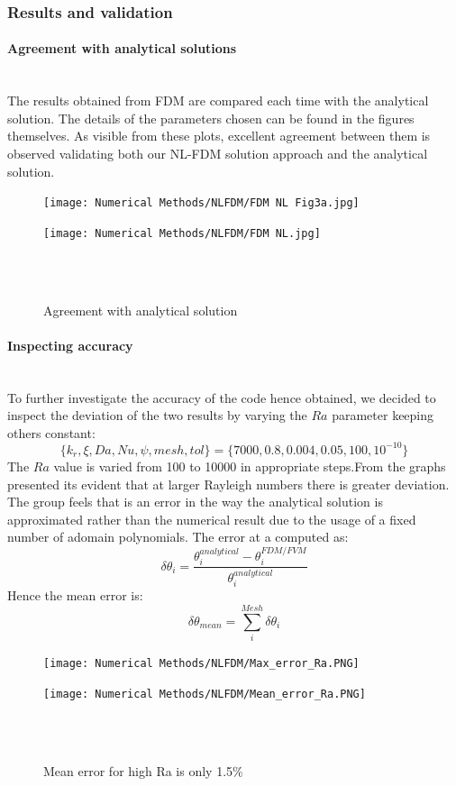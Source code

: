 \documentclass[12pt]{article}
\newcommand{\subsubsubsection}[1]{\paragraph{#1}\mbox{}\\}
\begin{document}
\subsubsection{Results and validation}
\subsubsubsection{Agreement with analytical solutions}
The results obtained from FDM are compared each time with the analytical solution. The details of the parameters chosen can be found in the figures themselves. As visible from these plots, excellent agreement between them is observed validating both our NL-FDM solution approach and the analytical solution.
\begin{figure}[H]
\begin{minipage}{.5\textwidth}
    \hspace{-1.4cm}
    \vspace{-1.4cm}
  \texttt{[image: Numerical Methods/NLFDM/FDM NL Fig3a.jpg]}
  \label{fig:12}
\end{minipage}%
\begin{minipage}{.5\textwidth}
  \hspace{-0.5cm}
  \vspace{-1.4cm}
  \texttt{[image: Numerical Methods/NLFDM/FDM NL.jpg]}
  \label{fig:13}
\end{minipage}
\\ \\ 
\caption{Agreement with analytical solution}
\end{figure}
\subsubsubsection{Inspecting accuracy}
To further investigate the accuracy of the code hence obtained, we decided to inspect the deviation of the two results by varying the $Ra$ parameter keeping others constant: 
\[
\{k_r,\xi, Da, Nu, \psi, mesh, tol\} = \{7000,0.8,0.004,0.05,100,10^{-10}\}
\]
The $Ra$ value is varied from 100 to 10000 in appropriate steps.From the graphs presented its evident that at larger Rayleigh numbers there is greater deviation. The group feels that is an error in the way the analytical solution is approximated rather than the numerical result due to the usage of a fixed number of adomain polynomials. The error at a computed as:
\[
\delta \theta_i = \frac{\theta^{analytical}_i-\theta^{FDM/FVM}_i}{\theta^{analytical}_i}
\]
Hence the mean error is:
\[
\delta \theta_{mean} = \sum_i^{Mesh} \delta \theta_i
\]

\begin{figure}[H]
\begin{minipage}{.5\textwidth}
    \hspace{-1.4cm}
    \vspace{-1.4cm}
  \texttt{[image: Numerical Methods/NLFDM/Max\_error\_Ra.PNG]}
  \label{fig:14}
\end{minipage}%
\begin{minipage}{.5\textwidth}
  \hspace{-0.5cm}
  \vspace{-1.4cm}
  \texttt{[image: Numerical Methods/NLFDM/Mean\_error\_Ra.PNG]}
  \label{fig:15}
\end{minipage}
\\ \\ 
\caption{Mean error for high Ra is only 1.5\%}
\end{figure}
\end{document}
